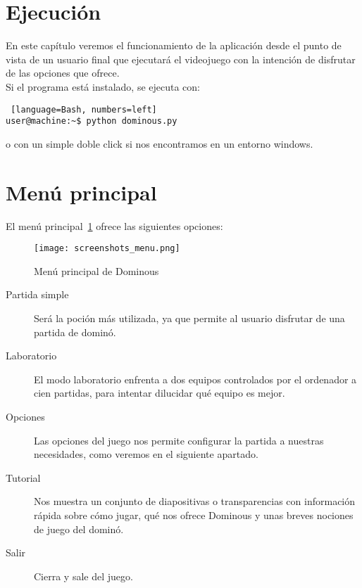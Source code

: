 



\section{Ejecución}

En este capítulo veremos el funcionamiento de la aplicación desde el punto de vista de un usuario final que ejecutará el
videojuego con la intención de disfrutar de las opciones que ofrece. \\

Si el programa está instalado, se ejecuta con:

\begin{lstlisting} [language=Bash, numbers=left]
user@machine:~$ python dominous.py
\end{lstlisting}

o con un simple doble click si nos encontramos en un entorno windows. \\


\section{Menú principal}

El menú principal~\ref{fig:screenshotsmenu} ofrece las siguientes opciones:

\begin{figure}[h]
  \begin{center}
    \texttt{[image: screenshots\_menu.png]}
  \end{center}
  \caption{Menú principal de Dominous}
  \label{fig:screenshotsmenu}
\end{figure}

\begin{description}
    \item[Partida simple] Será la poción más utilizada, ya que permite al usuario disfrutar de una partida de dominó.
    \item[Laboratorio] El modo laboratorio enfrenta a dos equipos controlados por el ordenador a cien partidas, para
            intentar dilucidar qué equipo es mejor.
    \item[Opciones] Las opciones del juego nos permite configurar la partida a nuestras necesidades, como veremos en el
            siguiente apartado.
    \item[Tutorial] Nos muestra un conjunto de diapositivas o transparencias con información rápida sobre cómo jugar,
            qué nos ofrece Dominous y unas breves nociones de juego del dominó.
    \item[Salir] Cierra y sale del juego.
\end{description}

